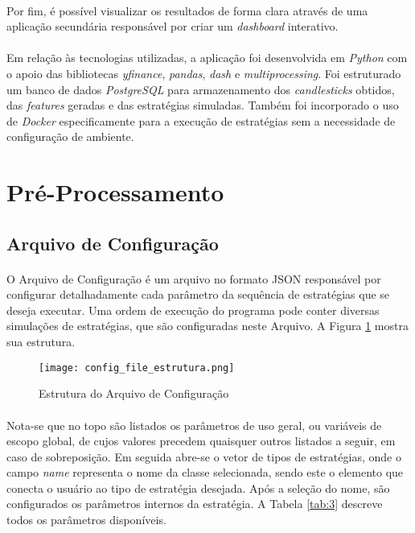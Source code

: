 \paragraph{} Por fim, é possível visualizar os resultados de forma clara através de uma aplicação secundária responsável por criar um \textit{dashboard} interativo.

\paragraph{} Em relação às tecnologias utilizadas, a aplicação foi desenvolvida em \textit{Python} com o apoio das bibliotecas \textit{yfinance}, \textit{pandas}, \textit{dash} e \textit{multiprocessing}. Foi estruturado um banco de dados \textit{PostgreSQL} para armazenamento dos \textit{candlesticks} obtidos, das \textit{features} geradas e das estratégias simuladas. Também foi incorporado o uso de \textit{Docker} especificamente para a execução de estratégias sem a necessidade de configuração de ambiente.

\section{Pré-Processamento}

\subsection{Arquivo de Configuração}

\paragraph{} O Arquivo de Configuração é um arquivo no formato JSON responsável por configurar detalhadamente cada parâmetro da sequência de estratégias que se deseja executar. Uma ordem de execução do programa pode conter diversas simulações de estratégias, que são configuradas neste Arquivo. A Figura \ref{fig:101} mostra sua estrutura.

\begin{figure}[h]
    \texttt{[image: config\_file\_estrutura.png]}
    \centering
    \caption{Estrutura do Arquivo de Configuração}
    \label{fig:101}
\end{figure}

\paragraph{} Nota-se que no topo são listados os parâmetros de uso geral, ou variáveis de escopo global, de cujos valores precedem quaisquer outros listados a seguir, em caso de sobreposição. Em seguida abre-se o vetor de tipos de estratégias, onde o campo \textit{name} representa o nome da classe selecionada, sendo este o elemento que conecta o usuário ao tipo de estratégia desejada. Após a seleção do nome, são configurados os parâmetros internos da estratégia. A Tabela \ref{tab:3} descreve todos os parâmetros disponíveis.

